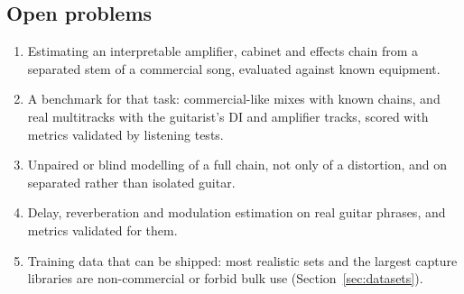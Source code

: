 \subsection{Open problems}

\begin{enumerate}
\item Estimating an interpretable amplifier, cabinet and effects chain from a
separated stem of a commercial song, evaluated against known equipment.
\item A benchmark for that task: commercial-like mixes with known chains, and
real multitracks with the guitarist's DI and amplifier tracks, scored with
metrics validated by listening tests.
\item Unpaired or blind modelling of a full chain, not only of a distortion,
and on separated rather than isolated guitar.
\item Delay, reverberation and modulation estimation on real guitar phrases,
and metrics validated for them.
\item Training data that can be shipped: most realistic sets and the largest
capture libraries are non-commercial or forbid bulk use (Section~\ref{sec:datasets}).
\end{enumerate}
